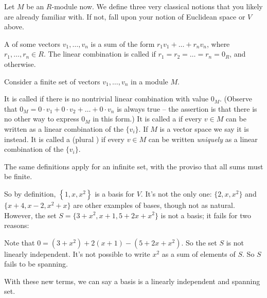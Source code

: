 Let $M$ be an $R$-module now.
We define three very classical notions that you likely are already familiar with.
If not, fall upon your notion of Euclidean space or $V$ above.
\begin{definition}
	A  of some vectors $v_1, \dots, v_n$
	is a sum of the form $r_1 v_1 + \dots + r_n v_n$,
	where $r_1, \dots, r_n \in R$.
	The linear combination is called 
	if $r_1 = r_2 = \dots = r_n = 0_R$, and  otherwise.
\end{definition}
\begin{definition}
	Consider a finite set of vectors $v_1, \dots, v_n$ in a module $M$.
	\begin{itemize}
		\ii It is called  if there
		is no nontrivial linear combination with value $0_M$.
		(Observe that $0_M = 0 \cdot v_1 + 0 \cdot v_2 + \dots + 0 \cdot v_n$
		is always true -- the assertion is that there is no other
		way to express $0_M$ in this form.)
		\ii It is called a  if every $v \in M$ can be written as
		a linear combination of the $\{v_i\}$.
		If $M$ is a vector space we say it is  instead.
		\ii It is called a  (plural )
		if every $v \in M$ can be written
		\emph{uniquely} as a linear combination of the $\{v_i\}$.
	\end{itemize}
	The same definitions apply for an infinite set, with the proviso
	that all sums must be finite.

\end{definition}
So by definition, $\left\{ 1,x,x^2 \right\}$ is a basis for $V$.
It's not the only one: $\{2, x, x^2\}$ and $\{x+4, x-2, x^2+x\}$
are other examples of bases, though not as natural.
However, the set $S = \{3+x^2, x+1, 5+2x+x^2\}$ is not a basis;
it fails for two reasons:
\begin{itemize}
	\ii Note that
	$0 = (3+x^2) + 2(x+1) - (5+2x+x^2)$.
	So the set $S$ is not linearly independent.
	\ii It's not possible to write $x^2$ as a sum of elements of $S$.
	So $S$ fails to be spanning.
\end{itemize}
With these new terms, we can say a basis is a linearly independent and spanning set.

